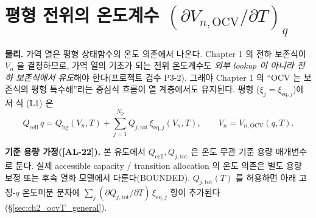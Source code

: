 \documentclass[11pt,a4paper]{article}
\newcommand{\eq}{\mathrm{eq}}
\newcommand{\bg}{\mathrm{bg}}
\newcommand{\cell}{\mathrm{cell}}
\newcommand{\OCV}{\mathrm{OCV}}
\newcommand{\tot}{\mathrm{tot}}
\newcommand{\AL}[1]{\textsf{[AL-#1]}}
\begin{document}
\section{평형 전위의 온도계수 $(\partial V_{n,\OCV}/\partial T)_q$}\label{sec:ch2_ocvT}
\textbf{물리.} 가역 열은 평형 상태함수의 온도 의존에서 나온다. Chapter 1 의 전하 보존식이 $V_n$ 을 결정하므로,
가역 열의 기초가 되는 전위 온도계수도 \emph{외부 lookup 이 아니라 전하 보존식에서 유도}해야 한다(프로젝트 검수
P3-2). 그래야 Chapter 1 의 ``OCV 는 보존식의 평형 특수해''라는 중심식 흐름이 열 계층에서도 유지된다. 평형
($\xi_j=\xi_{\eq,j}$)에서 식 (L1) 은
\begin{equation}
Q_\cell\,q=Q_\bg(V_n,T)+\sum_{j=1}^{N_p}Q_{j,\tot}\,\xi_{\eq,j}(V_n,T),\qquad V_n=V_{n,\OCV}(q,T).
\label{eq:ch2_eqbal}
\end{equation}

\textbf{기준 용량 가정(\AL{22}).} 본 유도에서 $Q_\cell,Q_{j,\tot}$ 은 온도 무관 기준 용량 매개변수로 둔다.
실제 accessible capacity / transition allocation 의 온도 의존은 별도 용량 보정 또는 후속 열화 모델에서
다룬다(BOUNDED). $Q_{j,\tot}(T)$ 를 허용하면 아래 고정-$q$ 온도미분 분자에 $\sum_j(\partial Q_{j,\tot}/\partial T)\,\xi_{\eq,j}$
항이 추가된다(\S\ref{sec:ch2_ocvT_general}).
\end{document}
